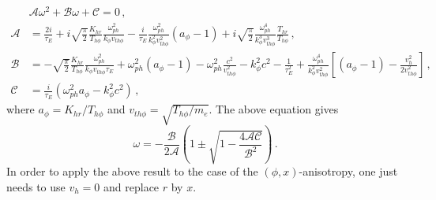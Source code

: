 \documentclass[aps,showpacs,superscriptaddress]{revtex4}
\begin{document}
\begin{align}
&\mathcal{A}\omega^2 +\mathcal{B}\omega +\mathcal{C} = 0\, , \label{eq:dispepoloidal} \\
\mathcal{A}& =\frac{2i}{\tau_E} + i\sqrt{\frac{\pi}{2}}\frac{K_{hr} }{T_{h\phi}}\frac{\omega_{ph}^2}{k_\phi v_{th\phi}} -\frac{i}{\tau_E}\frac{\omega_{ph}^2}{k_\phi^2 v_{th\phi}^2}(a_\phi-1) 
+i\sqrt{\frac{\pi}{2}}\frac{\omega_{ph}^4}{k_\phi^3 v_{th\phi}^3} \frac{T_{hr} }{T_{h\phi}} \label{eq:a} \, , \\
\mathcal{B} & =   - \sqrt{\frac{\pi}{2}}\frac{K_{hr} }{T_{h\phi}}\frac{\omega_{ph}^2}{k_\phi v_{th\phi} \tau_E}
+\omega_{ph}^2(a_\phi-1)-\omega_{ph}^2 \frac{c^2}{v_{th\phi}^2} -k_\phi^2 c^2 -\frac{1}{\tau_E^2 } 
 + \frac{\omega_{ph}^4}{k_\phi^2 v_{th\phi}^2}\left[(a_\phi-1)- \frac{v_h^2}{2v_{th\phi}^2} \right]  \, , \label{eq:b} \\
\mathcal{C} & =\frac{i}{\tau_E}(\omega_{ph}^2 a_\phi -k_\phi^2c^2 )\label{eq:c}\, , 
\end{align}
where $a_\phi = K_{hr}/T_{h\phi}$ and $v_{th\phi} = \sqrt{T_{h\phi}/m_e}$. 
The above equation gives
\begin{equation}
\omega  = -\frac{\mathcal{B}}{2\mathcal{A}}\left(1\pm \sqrt{1-\frac{4\mathcal{A}\mathcal{C}}{\mathcal{B}^2}} \right)
\label{eq:dispesol}\, .
\end{equation}
In order to apply the above result to the case of the $(\phi,x)$-anisotropy, one just needs to use $v_h = 0$ and replace $r$ by $x$.
\end{document}
